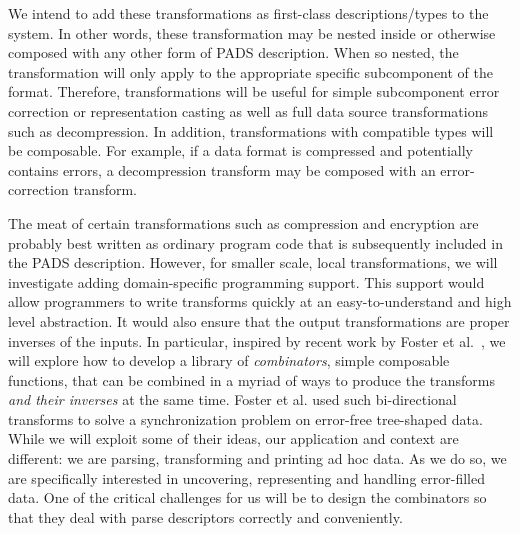 We intend to add these transformations as first-class
descriptions/types to the system.  In other words, these
transformation may be nested inside or otherwise composed with any
other form of PADS description.  When so nested, the transformation
will only apply to the appropriate specific subcomponent of the
format.  Therefore, transformations will be useful for simple
subcomponent error correction or representation casting as well as
full data source transformations such as decompression.  In addition,
transformations with compatible types will be composable.  For
example, if a data format is compressed and potentially contains
errors, a decompression transform may be composed with an
error-correction transform.

The meat of certain transformations such as compression and encryption
are probably best written as ordinary program code that is
subsequently included in the PADS description.  However, for smaller
scale, local transformations, we will investigate adding domain-specific
programming support.  This support would allow programmers to write
transforms quickly at an easy-to-understand and high level
abstraction.  It would also ensure that the output transformations are
proper inverses of the inputs.  In particular, inspired by recent work
by Foster et al.~\cite{foster+:lens}, we will explore how to develop a
library of {\em combinators}, simple composable functions, that can be
combined in a myriad of ways to produce the transforms {\em and their
inverses} at the same time.  Foster et al. used such bi-directional transforms to
solve a synchronization problem on error-free tree-shaped data. 
While we will exploit some of their
ideas, our application and
context are different: we are parsing, transforming and printing ad
hoc data.  As we do so, we are specifically interested in uncovering,
representing and handling error-filled data.  One of the critical
challenges for us will be to design the combinators so that they deal
with \pads{} parse descriptors correctly
and conveniently.



